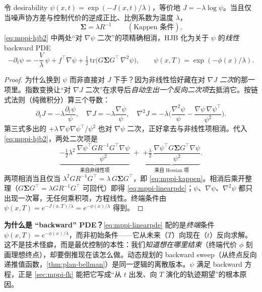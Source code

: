 \begin{theorem}\label{thm:mppi-kappen}
令 desirability $\psi(x,t)=\exp(-J(x,t)/\lambda)$，等价地 $J=-\lambda\log\psi$。当且仅当噪声协方差与控制代价的逆成正比、比例系数为温度 $\lambda$，
\begin{equation}
  \boxed{\ \boldsymbol{\Sigma}=\lambda R^{-1}\ }\qquad(\text{Kappen 条件}),
  \label{eq:mppi-kappen}
\end{equation}
\cref{eq:mppi-hjb2} 中两处“对 $\nabla\psi$ 二次”的项精确相消，HJB 化为关于 $\psi$ 的\emph{线性} backward PDE
\begin{equation}
  -\partial_t\psi=-\frac{V}{\lambda}\,\psi+f^\top\nabla\psi+\tfrac12\,\mathrm{tr}\!\big(G\boldsymbol{\Sigma}G^\top\,\nabla^2\psi\big),\qquad\psi(x,T)=\exp(-\phi(x)/\lambda).
  \label{eq:mppi-linearpde}
\end{equation}
\end{theorem}
\begin{proof}
为什么换到 $\psi$ 而非直接对 $J$ 下手？因为非线性恰好藏在对 $\nabla J$ \emph{二次}的那一项里。指数变换让“对 $\nabla J$ 二次”在求导后\emph{自动生出一个反向二次项}去抵消它。按链式法则（纯微积分）算三个导数：
\begin{equation}
  \partial_t J=-\lambda\frac{\partial_t\psi}{\psi},\quad
  \nabla J=-\lambda\frac{\nabla\psi}{\psi},\quad
  \nabla^2 J=-\lambda\Big(\frac{\nabla^2\psi}{\psi}-\frac{\nabla\psi\,\nabla\psi^\top}{\psi^2}\Big).
  \label{eq:mppi-chainrule}
\end{equation}
第三式多出的 $+\lambda\,\nabla\psi\nabla\psi^\top/\psi^2$ 也对 $\nabla\psi$ 二次，正好拿去与非线性项相消。代入 \cref{eq:mppi-hjb2}，两处二次项是
\[
  \underbrace{-\tfrac12\lambda^2\,\frac{\nabla\psi^\top GR^{-1}G^\top\nabla\psi}{\psi^2}}_{\text{来自非线性项}}
  \;+\;
  \underbrace{+\tfrac{\lambda}{2}\,\frac{\nabla\psi^\top G\boldsymbol{\Sigma}G^\top\nabla\psi}{\psi^2}}_{\text{来自 Hessian 项}}.
\]
两项相消当且仅当 $\lambda^2 GR^{-1}G^\top=\lambda\,G\boldsymbol{\Sigma}G^\top$，即 \cref{eq:mppi-kappen}。相消后乘开整理（$G\boldsymbol{\Sigma}G^\top=\lambda GR^{-1}G^\top$ 可回代）即得 \cref{eq:mppi-linearpde}；$\psi$、$\nabla\psi$、$\nabla^2\psi$ 都只出现一次幂，无任何乘积项，方程线性。终端条件由 $\psi(x,T)=e^{-J(x,T)/\lambda}=e^{-\phi(x)/\lambda}$ 得到。
\end{proof}

\noindent \textbf{为什么是 “backward” PDE？}\cref{eq:mppi-linearpde} 配的是\emph{终端}条件 $\psi(x,T)=e^{-\phi(x)/\lambda}$，而非初始条件——它从未来（$T$）向现在（$t$）反向求解。这不是技术怪癖，而是最优控制的本性：我们\emph{知道想在哪里结束}（终端代价 $\phi$ 刻画理想终点），却要倒推现在该怎么做。动态规划的 backward sweep（从终点反向递推值函数，\cref{thm:plan-bellman}）是同一逻辑的离散版本。$\psi$ 满足 backward 方程，正是 \cref{sec:mppi-fk} 能把它写成“从 $t$ 出发、向 $T$ 演化的轨迹期望”的根本原因。

